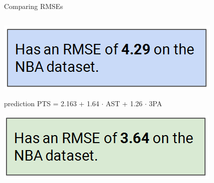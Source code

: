 \documentclass[aspectratio=169]{../latex_main/tntbeamer}  %
\begin{document}
\begin{frame}{Comparing RMSEs}
\begin{columns}
\begin{column}{.4\textwidth}
	                \includegraphics[scale=.3]{Bild11}
	            
	            prediction PTS = 2.163 + 1.64 $\cdot$ AST + 1.26 $\cdot$ 3PA

	                \includegraphics[scale=.3]{Bild12}

	        \end{column}
	    \end{columns}
	\end{frame}
	
	
	
\end{document}
